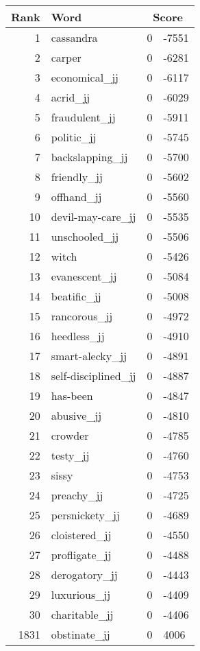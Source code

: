 \begin{longtable}[!htbp]{| rlr@{.}l |}
    \hline
    \textbf{Rank} & \textbf{Word} & \multicolumn{2}{c|}{\textbf{Score}} \\
    \hline
    \endhead
    1 & cassandra & 0 & -7551 \\
    2 & carper & 0 & -6281 \\
    3 & economical\_jj & 0 & -6117 \\
    4 & acrid\_jj & 0 & -6029 \\
    5 & fraudulent\_jj & 0 & -5911 \\
    6 & politic\_jj & 0 & -5745 \\
    7 & backslapping\_jj & 0 & -5700 \\
    8 & friendly\_jj & 0 & -5602 \\
    9 & offhand\_jj & 0 & -5560 \\
    10 & devil-may-care\_jj & 0 & -5535 \\
    11 & unschooled\_jj & 0 & -5506 \\
    12 & witch & 0 & -5426 \\
    13 & evanescent\_jj & 0 & -5084 \\
    14 & beatific\_jj & 0 & -5008 \\
    15 & rancorous\_jj & 0 & -4972 \\
    16 & heedless\_jj & 0 & -4910 \\
    17 & smart-alecky\_jj & 0 & -4891 \\
    18 & self-disciplined\_jj & 0 & -4887 \\
    19 & has-been & 0 & -4847 \\
    20 & abusive\_jj & 0 & -4810 \\
    21 & crowder & 0 & -4785 \\
    22 & testy\_jj & 0 & -4760 \\
    23 & sissy & 0 & -4753 \\
    24 & preachy\_jj & 0 & -4725 \\
    25 & persnickety\_jj & 0 & -4689 \\
    26 & cloistered\_jj & 0 & -4550 \\
    27 & profligate\_jj & 0 & -4488 \\
    28 & derogatory\_jj & 0 & -4443 \\
    29 & luxurious\_jj & 0 & -4409 \\
    30 & charitable\_jj & 0 & -4406 \\
    1831 & obstinate\_jj & 0 & 4006 \\

\end{longtable}
